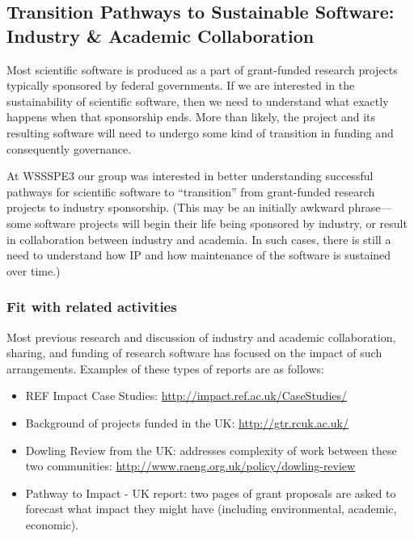
\subsection{Transition Pathways to Sustainable Software: Industry \& Academic Collaboration}
\label{sec:industry_interaction}


Most scientific software is produced as a part of grant-funded research projects typically 
sponsored by federal governments. If we are interested in the sustainability of
scientific software, then we need to understand what exactly happens when that
sponsorship ends. More than likely, the project and its resulting software will
need to undergo some kind of transition in funding and consequently governance.

At WSSSPE3 our group was interested in better understanding successful pathways
for scientific software to ``transition'' from grant-funded research
projects to industry sponsorship. (This may be an initially awkward
phrase---some software projects will begin their life being sponsored by
industry, or result in collaboration between industry and academia. In such
cases, there is still a need to understand how IP and how maintenance of the
software is sustained over time.)

\subsubsection{Fit with related activities}

Most previous research and discussion of industry and academic collaboration, sharing, and funding of research software has focused on the impact of such arrangements. Examples of these types of reports are as follows:

\begin{itemize}
\item REF Impact Case Studies: \url{http://impact.ref.ac.uk/CaseStudies/}
\item Background of projects funded in the UK: \url{http://gtr.rcuk.ac.uk/}
\item Dowling Review from the UK: addresses complexity of work between these two
communities: \url{http://www.raeng.org.uk/policy/dowling-review}
\item Pathway to Impact - UK report: two pages of grant proposals are asked to
forecast what impact they might have (including environmental, academic, economic).
\end{itemize}

